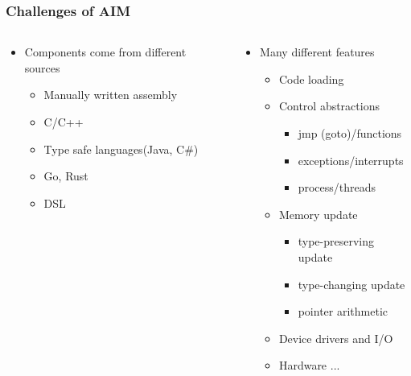 \begin{frame}[t]
	\frametitle{ Challenges of AIM}
	\begin{columns}[t]
		\begin{column}{.5\textwidth}
			
			\begin{itemize}\Large
				\item Components come
				from different
				sources
				\begin{itemize}\large
					\item Manually written
					assembly
					\item C/C++
					\item Type safe languages(Java, C\#)
					\item Go, Rust
					\item DSL
				\end{itemize}
			\end{itemize}
			
		\end{column}
		
		\begin{column}{.5\textwidth}
			
			\begin{itemize}\Large
				\item Many different features
				\begin{itemize}\large
					\item Code loading
					\item Control abstractions
					\begin{itemize}\large
						\item jmp (goto)/functions
						\item exceptions/interrupts
						\item process/threads
					\end{itemize}		
					
					\item Memory update
					\begin{itemize}\large
						\item type-preserving update
						\item type-changing update
						\item pointer arithmetic
					\end{itemize}	
					\item Device drivers and I/O
					\item Hardware ...					
				\end{itemize}
			\end{itemize}
			
		\end{column}
	\end{columns}
\end{frame}

